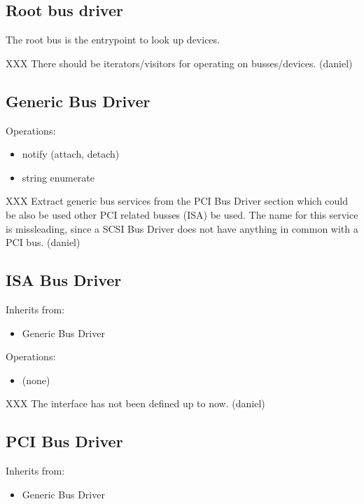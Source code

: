 \subsection{Root bus driver}

The root bus is the entrypoint to look up devices. 

XXX There should be iterators/visitors for operating on
busses/devices.  (daniel)

\subsection{Generic Bus Driver}

Operations:
\begin{itemize}
\item notify (attach, detach)
\item string enumerate
\end{itemize}

XXX Extract generic bus services from the PCI Bus Driver section
which could be also be used other PCI related busses (ISA) be used.
The name for this service is missleading, since a SCSI Bus Driver
does not have anything in common with a PCI bus.  (daniel)

\subsection{ISA Bus Driver}

Inherits from:
\begin{itemize}
\item Generic Bus Driver
\end{itemize}

Operations:
\begin{itemize}
\item (none)
\end{itemize}

XXX The interface has not been defined up to now. (daniel)

\subsection{PCI Bus Driver}

Inherits from:
\begin{itemize}
\item Generic Bus Driver
\end{itemize}

